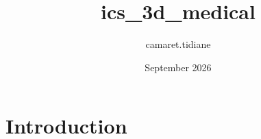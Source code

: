 \documentclass{article}
\title{ics_3d_medical}
\author{camaret.tidiane }
\date{September 2026}
\begin{document}
\maketitle

\section{Introduction}
\end{document}

